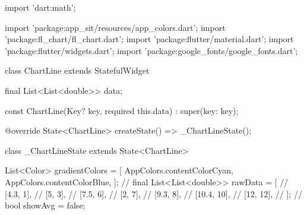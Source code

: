 import 'dart:math';

import 'package:app_sit/resources/app_colors.dart';
import 'package:fl_chart/fl_chart.dart';
import 'package:flutter/material.dart';
import 'package:flutter/widgets.dart';
import 'package:google_fonts/google_fonts.dart';

class ChartLine extends StatefulWidget {
  final List<List<double>> data;

  const ChartLine({Key? key, required this.data}) : super(key: key);

  @override
  State<ChartLine> createState() => _ChartLineState();
}

class _ChartLineState extends State<ChartLine> {
  List<Color> gradientColors = [
    AppColors.contentColorCyan,
    AppColors.contentColorBlue,
  ];
  // final List<List<double>> rawData = [
  //   [4.3, 1],
  //   [5, 3],
  //   [7.5, 6],
  //   [2, 7],
  //   [9.3, 8],
  //   [10.4, 10],
  //   [12, 12],
  // ];
  // bool showAvg = false;

}
